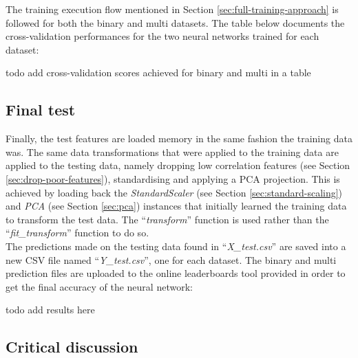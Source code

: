 \documentclass[letterpaper,12pt]{article}
\begin{document}
The training execution flow mentioned in Section \ref{sec:full-training-approach} is followed for both the binary and multi datasets. The table below documents the cross-validation performances for the two neural networks trained for each dataset:

todo add cross-validation scores achieved for binary and multi in a table



\subsection{Final test}

Finally, the test features are loaded memory in the same fashion the training data was. The same data transformations that were applied to the training data are applied to the testing data, namely dropping low correlation features (see Section \ref{sec:drop-poor-features}), standardising and applying a PCA projection. This is achieved by loading back the \textit{StandardScaler} (see Section \ref{sec:standard-scaling}) and \textit{PCA} (see Section \ref{sec:pca}) instances that initially learned the training data to transform the test data. The ``\textit{transform}'' function is used rather than the ``\textit{fit\_transform}'' function to do so.\\

The predictions made on the testing data  found in ``\textit{X\_test.csv}'' are saved into a new  CSV file named ``\textit{Y\_test.csv}'', one for each  dataset. The binary and multi prediction files are uploaded to the online leaderboards tool provided  in order to get the final accuracy of the neural network:

todo add results here


\subsection{Critical discussion}
\end{document}

